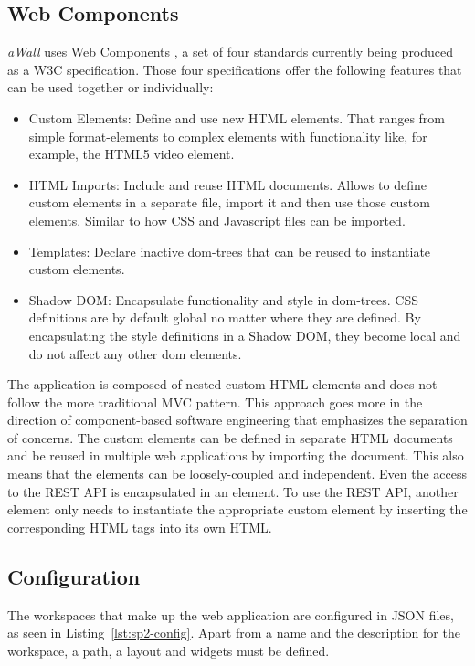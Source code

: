 \documentclass{sigchi}
\begin{document}
\subsection{Web Components}
\textit{aWall} uses Web Components \cite{webcomponents.org}, a set of four standards currently being produced as a W3C specification.
Those four specifications offer the following features that can be used together or individually:
\begin{itemize}
	\item Custom Elements: Define and use new HTML elements. 
	That ranges from simple format-elements to complex elements with functionality like, for example, the HTML5 video element.
	\item HTML Imports: Include and reuse HTML documents.
	Allows to define custom elements in a separate file,  import it and then use those custom elements. 
	Similar to how CSS and Javascript files can be imported.
	\item Templates: Declare inactive \gls{dom}-trees that can be reused to instantiate custom elements.
	\item Shadow DOM: Encapsulate functionality and style in \gls{dom}-trees.
	CSS definitions are by default global no matter where they are defined.
	By encapsulating the style definitions in a Shadow DOM, they become local and do not affect any other \gls{dom} elements.
\end{itemize}

The application is composed of nested custom HTML elements and does not follow the more traditional MVC pattern. 
This approach goes more in the direction of component-based software engineering that emphasizes the separation of concerns.
The custom elements can be defined in separate HTML documents and be reused in multiple web applications by importing the document.
This also means that the elements can be loosely-coupled and independent.
Even the access to the REST API is encapsulated in an element. 
To use the REST API, another element only needs to instantiate the appropriate custom element by inserting the corresponding HTML tags into its own HTML.


\subsection{Configuration}

The workspaces that make up the web application are configured in JSON files, as seen in Listing~\ref{lst:sp2-config}. 
Apart from a name and the description for the workspace, a path, a layout and widgets must be defined. 
\end{document}
